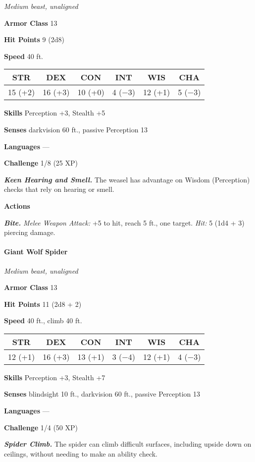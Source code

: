 \documentclass[
]{article}
\begin{document}
\emph{Medium beast, unaligned}

\textbf{Armor Class} 13

\textbf{Hit Points} 9 (2d8)

\textbf{Speed} 40 ft.

\begin{longtable}[]{@{}cccccc@{}}
\toprule
STR & DEX & CON & INT & WIS & CHA\tabularnewline
\midrule
\endhead
15 (+2) & 16 (+3) & 10 (+0) & 4 (−3) & 12 (+1) & 5 (−3)\tabularnewline
\bottomrule
\end{longtable}

\textbf{Skills} Perception +3, Stealth +5

\textbf{Senses} darkvision 60 ft., passive Perception 13

\textbf{Languages} ---

\textbf{Challenge} 1/8 (25 XP)

\emph{\textbf{Keen Hearing and Smell.}} The weasel has advantage on
Wisdom (Perception) checks that rely on hearing or smell.

\textbf{Actions}

\emph{\textbf{Bite.}} \emph{Melee Weapon Attack:} +5 to hit, reach 5
ft., one target. \emph{Hit:} 5 (1d4 + 3) piercing damage.

\hypertarget{giant-wolf-spider}{%
\paragraph{Giant Wolf Spider}\label{giant-wolf-spider}}

\emph{Medium beast, unaligned}

\textbf{Armor Class} 13

\textbf{Hit Points} 11 (2d8 + 2)

\textbf{Speed} 40 ft., climb 40 ft.

\begin{longtable}[]{@{}cccccc@{}}
\toprule
STR & DEX & CON & INT & WIS & CHA\tabularnewline
\midrule
\endhead
12 (+1) & 16 (+3) & 13 (+1) & 3 (−4) & 12 (+1) & 4 (−3)\tabularnewline
\bottomrule
\end{longtable}

\textbf{Skills} Perception +3, Stealth +7

\textbf{Senses} blindsight 10 ft., darkvision 60 ft., passive Perception
13

\textbf{Languages} ---

\textbf{Challenge} 1/4 (50 XP)

\emph{\textbf{Spider Climb.}} The spider can climb difficult surfaces,
including upside down on ceilings, without needing to make an ability
check.
\end{document}
